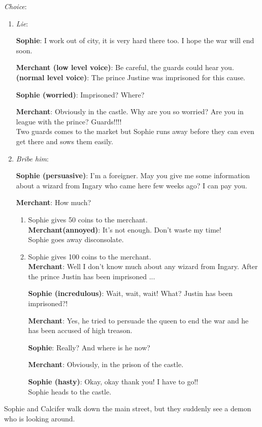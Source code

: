 \noindent \textit{Choice}:
\begin{enumerate}
\item \textit{Lie}:
  
  \textbf{Sophie}: I work out of city, it is very hard there too. I hope the war will end soon.
  
  \textbf{Merchant (low level voice)}: Be careful, the guards could hear you. \textbf{(normal level voice)}: The prince Justine was imprisoned for this cause.
  
  \textbf{Sophie (worried)}: Imprisoned? Where? 

  \textbf{Merchant}: Obviously in the castle. Why are you so worried? Are you in league with the prince? Guards!!!!\\

  Two guards comes to the market but Sophie runs away before they can even get there and sows them easily.
  
\item \textit{Bribe him}:
  
  \textbf{Sophie (persuasive)}: I'm a foreigner. May you give me some information about a wizard from Ingary who came here few weeks ago? I can pay you.
  
  \textbf{Merchant}: How much?
  
  \begin{enumerate}
  \item Sophie gives 50 coins to the merchant.\\

    \textbf{Merchant(annoyed)}: It’s not enough. Don’t waste my time!\\

    \noindent Sophie goes away disconsolate.

  \item Sophie gives 100 coins to the merchant.\\
    
    \textbf{Merchant}: Well I don't know much about any wizard from Ingary. After the prince Justin has been imprisoned ...

    \textbf{Sophie (incredulous)}: Wait, wait, wait! What? Justin has been imprisoned?!
    
    \textbf{Merchant}: Yes, he tried to persuade the queen to end the war and he has been accused of high treason.
    
    \textbf{Sophie}: Really? And where is he now?
    
    \textbf{Merchant}: Obviously, in the prison of the castle.
    
    \textbf{Sophie (hasty)}: Okay, okay thank you! I have to go!!\\

    \noindent Sophie heads to the castle.
  \end{enumerate}
\end{enumerate}
\noindent Sophie and Calcifer walk down the main street, but they suddenly see a demon who is looking around.

